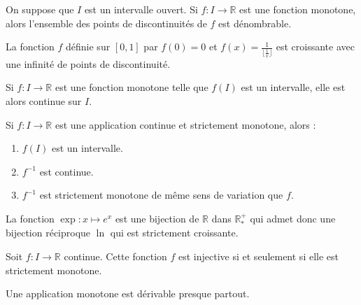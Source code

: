   \begin{theorem}
    On suppose que $I$ est un intervalle ouvert. Si $f : I \rightarrow \mathbb{R}$ est une fonction monotone, alors l'ensemble des points de discontinuités de $f$ est dénombrable.
  \end{theorem}

  \begin{example}
    La fonction $f$ définie sur $[0,1]$ par $f(0) = 0$ et $f(x) = \frac{1}{\lfloor \frac{1}{x} \rfloor}$ est croissante avec une infinité de points de discontinuité.
  \end{example}


  \begin{proposition}
    Si $f : I \rightarrow \mathbb{R}$ est une fonction monotone telle que $f(I)$ est un intervalle, elle est alors continue sur $I$.
  \end{proposition}

  \begin{theorem}
    Si $f : I \rightarrow \mathbb{R}$ est une application continue et strictement monotone, alors :
    \begin{enumerate}[label={\bfseries(\roman*)}]
      \item $f(I)$ est un intervalle.
      \item $f^{-1}$ est continue.
      \item $f^{-1}$ est strictement monotone de même sens de variation que $f$.
    \end{enumerate}
  \end{theorem}

  \begin{example}
    La fonction $\exp : x \mapsto e^x$ est une bijection de $\mathbb{R}$ dans $\mathbb{R}^{+}_{*}$ qui admet donc une bijection réciproque $\ln$ qui est strictement croissante.
  \end{example}

  \begin{proposition}
    Soit $f : I \rightarrow \mathbb{R}$ continue. Cette fonction $f$ est injective si et seulement si elle est strictement monotone.
  \end{proposition}


  \begin{theorem}
    Une application monotone est dérivable presque partout.
  \end{theorem}

